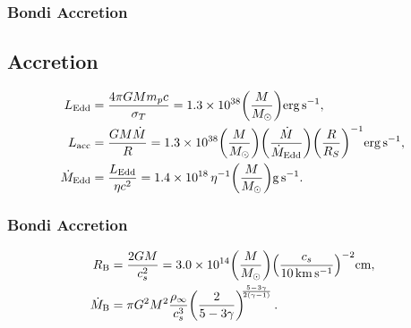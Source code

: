 \begin{multicols}{2}
\subsubsection*{Bondi Accretion}
\footnotesize



\vfill\null\columnbreak

\subsection*{Accretion}
\[
\begin{aligned}
L_{\rm Edd} &= \frac{4\pi G M m_p c}{\sigma_T}
= 1.3\times10^{38}\!\left(\frac{M}{M_\odot}\right)\!{\rm erg\,s^{-1}},\\
L_{\rm acc} &= \frac{GM\dot M}{R}
= 1.3\times10^{38}\!
\left(\frac{M}{M_\odot}\right)\!
\left(\frac{\dot M}{\dot M_{\rm Edd}}\right)\!
\left(\frac{R}{R_S}\right)^{-1}\!{\rm erg\,s^{-1}},\\
\dot M_{\rm Edd} &= \frac{L_{\rm Edd}}{\eta c^2}
= 1.4\times10^{18}\,\eta^{-1}
\!\left(\frac{M}{M_\odot}\right)\!{\rm g\,s^{-1}}.
\end{aligned}
\]

\subsubsection*{Bondi Accretion}
\[
\begin{aligned}
R_{\rm B} &= \frac{2GM}{c_s^2}
= 3.0\times10^{14}\!\left(\frac{M}{M_\odot}\right)
\!\left(\frac{c_s}{10\,{\rm km\,s^{-1}}}\right)^{-2}\!{\rm cm},\\
\dot M_{\rm B} &= \pi G^2 M^2 \frac{\rho_\infty}{c_s^3}
\!\left(\frac{2}{5-3\gamma}\right)^{\!\!\frac{5-3\gamma}{2(\gamma-1)}}.
\end{aligned}
\]

\end{multicols}


\restoregeometry
